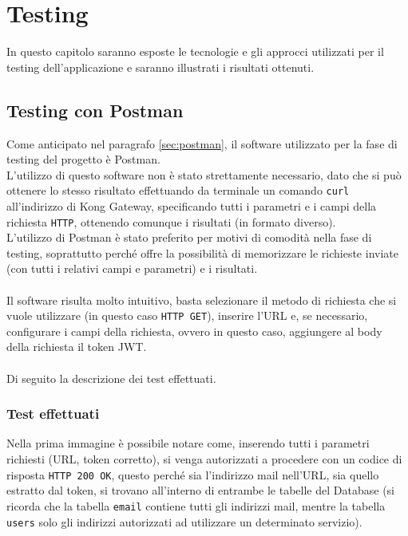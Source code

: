 \chapter{Testing}\label{chapter:testing}

In questo capitolo saranno esposte le tecnologie e gli approcci utilizzati per il testing dell'applicazione e saranno illustrati i risultati ottenuti.

\section{Testing con Postman}\label{sec:test1}
Come anticipato nel paragrafo \ref{sec:postman}, il software utilizzato per la fase di testing del progetto è Postman.\\
L'utilizzo di questo software non è stato strettamente necessario, dato che si può ottenere lo stesso risultato effettuando da terminale un comando \texttt{curl}
all'indirizzo di Kong Gateway, specificando tutti i parametri e i campi della richiesta \texttt{HTTP}, ottenendo comunque i risultati (in formato diverso).\\
L'utilizzo di Postman è stato preferito per motivi di comodità nella fase di testing, soprattutto perché offre la possibilità di memorizzare le richieste inviate 
(con tutti i relativi campi e parametri) e i risultati.\\ \\
Il software risulta molto intuitivo, basta selezionare il metodo di richiesta che si vuole utilizzare (in questo caso \texttt{HTTP GET}), 
inserire l'URL e, se necessario, configurare i campi della richiesta, ovvero in questo caso, aggiungere al body della richiesta il token JWT. \cite{Postman }\\ \\

Di seguito la descrizione dei test effettuati.\\

\subsection{Test effettuati}\label{subsec:testeffettuati}

Nella prima immagine è possibile notare come, inserendo tutti i parametri richiesti (URL, token corretto), si venga autorizzati a procedere con un codice di risposta
\texttt{HTTP 200 OK}, questo perché sia l'indirizzo mail nell'URL, sia quello estratto dal token, si trovano all'interno di entrambe le tabelle del Database 
(si ricorda che la tabella \texttt{email} contiene tutti gli indirizzi mail, mentre la tabella \texttt{users} solo gli indirizzi autorizzati ad utilizzare un determinato servizio).

